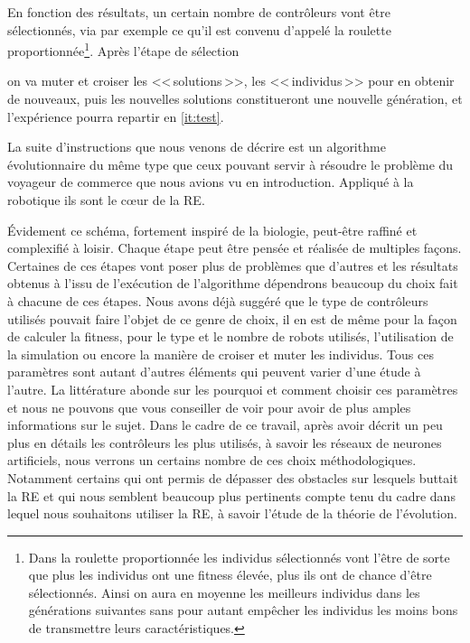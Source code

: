 \begin{inparaenum}[(\itshape 1\upshape)]
\item En fonction des résultats, un certain nombre de contrôleurs vont être sélectionnés, via par exemple ce qu'il est convenu d'appelé la roulette proportionnée\footnote{Dans la roulette proportionnée les individus sélectionnés vont l'être de sorte que plus les individus ont une fitness élevée, plus ils ont de chance d'être sélectionnés. Ainsi on aura en moyenne les meilleurs individus dans les générations suivantes sans pour autant empêcher les individus les moins bons de transmettre leurs caractéristiques.}. Après l'étape de sélection \item on va muter et croiser les <<\,solutions\,>>, les <<\,individus\,>> pour en obtenir de nouveaux, puis les nouvelles solutions constitueront une nouvelle génération, et l'expérience pourra repartir en \ref{it:test}.

\end{inparaenum}


La suite d'instructions que nous venons de décrire est un algorithme évolutionnaire du même type que ceux pouvant servir à résoudre le problème du voyageur de commerce que nous avions vu en introduction. Appliqué à la robotique ils sont le cœur de la RE.

Évidement ce schéma, fortement inspiré de la biologie, peut-être raffiné et complexifié à loisir. Chaque étape peut être pensée et réalisée de multiples façons. Certaines de ces étapes vont poser plus de problèmes que d'autres et les résultats obtenus à l'issu de l'exécution de l'algorithme dépendrons beaucoup du choix fait à chacune de ces étapes. Nous avons déjà suggéré que le type de contrôleurs utilisés pouvait faire l'objet de ce genre de choix, il en est de même pour la façon de calculer la fitness, pour le type et le nombre de robots utilisés, l'utilisation de la simulation ou encore la manière de croiser et muter les individus. Tous ces paramètres sont autant d'autres éléments qui peuvent varier d'une étude à l'autre. La littérature abonde sur les pourquoi et comment choisir ces paramètres et nous ne pouvons que vous conseiller de voir \cite{nolfi00evolrobobiolintetechselfmach} pour avoir de plus amples informations sur le sujet. Dans le cadre de ce travail, après avoir décrit un peu plus en détails les contrôleurs les plus utilisés, à savoir les réseaux de neurones artificiels, nous verrons un certains nombre de ces choix méthodologiques. Notamment certains qui ont permis de dépasser des obstacles sur lesquels buttait la RE et qui nous semblent beaucoup plus pertinents compte tenu du cadre dans lequel nous souhaitons utiliser la RE, à savoir l'étude de la théorie de l'évolution.


